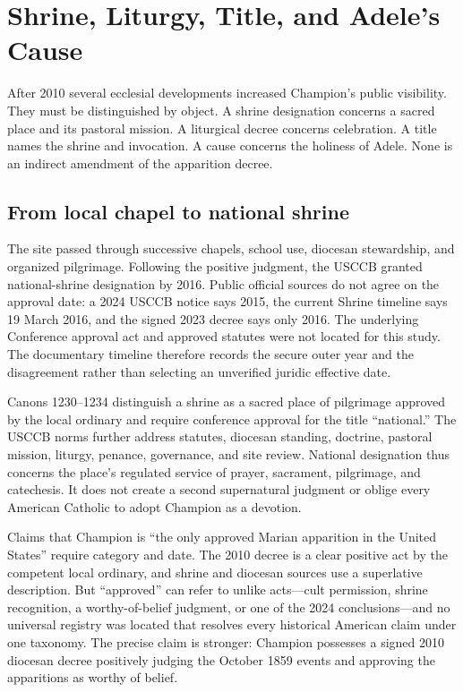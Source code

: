 \section{Shrine, Liturgy, Title, and Adele's Cause}

After 2010 several ecclesial developments increased Champion's public visibility. They must be distinguished by object. A shrine designation concerns a sacred place and its pastoral mission. A liturgical decree concerns celebration. A title names the shrine and invocation. A cause concerns the holiness of Adele. None is an indirect amendment of the apparition decree.

\subsection{From local chapel to national shrine}

The site passed through successive chapels, school use, diocesan stewardship, and organized pilgrimage. Following the positive judgment, the USCCB granted national-shrine designation by 2016. Public official sources do not agree on the approval date: a 2024 USCCB notice says 2015, the current Shrine timeline says 19 March 2016, and the signed 2023 decree says only 2016. The underlying Conference approval act and approved statutes were not located for this study. The documentary timeline therefore records the secure outer year and the disagreement rather than selecting an unverified juridic effective date.

Canons 1230--1234 distinguish a shrine as a sacred place of pilgrimage approved by the local ordinary and require conference approval for the title “national.” The USCCB norms further address statutes, diocesan standing, doctrine, pastoral mission, liturgy, penance, governance, and site review. National designation thus concerns the place's regulated service of prayer, sacrament, pilgrimage, and catechesis. It does not create a second supernatural judgment or oblige every American Catholic to adopt Champion as a devotion.

Claims that Champion is “the only approved Marian apparition in the United States” require category and date. The 2010 decree is a clear positive act by the competent local ordinary, and shrine and diocesan sources use a superlative description. But “approved” can refer to unlike acts---cult permission, shrine recognition, a worthy-of-belief judgment, or one of the 2024 conclusions---and no universal registry was located that resolves every historical American claim under one taxonomy. The precise claim is stronger: Champion possesses a signed 2010 diocesan decree positively judging the October 1859 events and approving the apparitions as worthy of belief.

